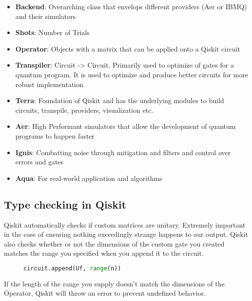 \documentclass[12pt]{article}
\begin{document}
\begin{itemize}
    \item \textbf{Backend}:  	Overarching class that envelops different providers (Aer or IBMQ) and their simulators
    \item \textbf{Shots}: 	Number of Trials
    \item \textbf{Operator}:	Objects with a matrix that can be applied onto a Qiskit circuit
    \item \textbf{Transpiler}:	Circuit -> Circuit. Primarily used to optimize of gates for a quantum program. It is used to optimize and produce better circuits for more robust implementation
    \item \textbf{Terra}:	Foundation of Qiskit and has the underlying modules to build circuits, transpile, providers, visualization etc.
    \item \textbf{Aer}:	High Performant simulators that allow the development of quantum programs to happen faster
    \item \textbf{Ignis}:	Combatting noise through mitigation and filters and control over errors and gates
    \item \textbf{Aqua}:	For real-world application and algorithms
\end{itemize}

\subsection{Type checking in Qiskit}

Qiskit automatically checks if custom matrices are unitary. Extremely important in the case of ensuring nothing exceedingly strange happens to our output. Qiskit also checks whether or not the dimensions of the custom gate you created matches the range you specified when you append it to the circuit.

\begin{figure}[h]
    \centering
    \begin{lstlisting}[numbers=none, language=Python]
    circuit.append(Uf, range(n))
\end{lstlisting}
\end{figure}

If the length of the range you supply doesn’t match the dimensions of the Operator, Qiskit will throw an error to prevent undefined behavior.

\nocite{pyquil}
\nocite{Qiskit}
\end{document}
